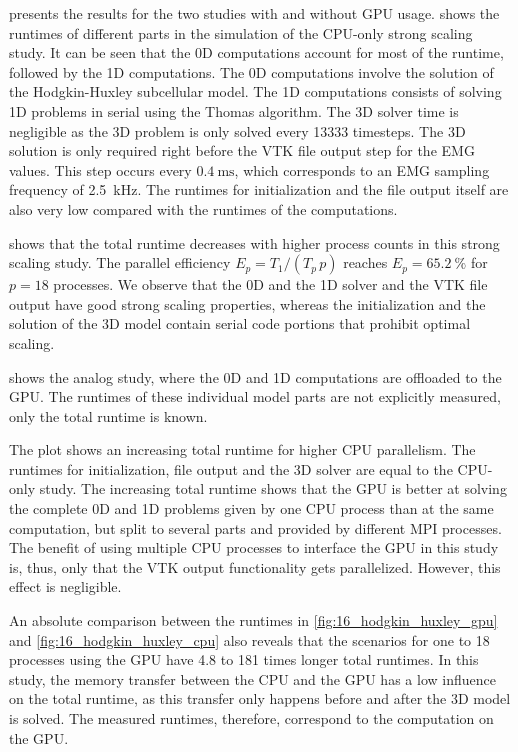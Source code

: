  presents the results for the two studies with and without GPU usage.  shows the runtimes of different parts in the simulation of the CPU-only strong scaling study. It can be seen that the 0D computations account for most of the runtime, followed by the 1D computations. The 0D computations involve the solution of the Hodgkin-Huxley subcellular model. The 1D computations consists of solving 1D problems in serial using the Thomas algorithm. The 3D solver time is negligible as the 3D problem is only solved every \num{13333} timesteps. The 3D solution is only required right before the VTK file output step for the EMG values. This step occurs every $\SI{0.4}{\ms}$, which corresponds to an EMG sampling frequency of \SI{2.5}{\kilo\hertz}.
The runtimes for initialization and the file output itself are also very low compared with the runtimes of the computations.

 shows that the total runtime decreases with higher process counts in this strong scaling study. The parallel efficiency $E_p = T_1/(T_p\,p)$ reaches $E_p=\SI{65.2}{\percent}$ for $p=18$ processes. We observe that the 0D and the 1D solver and the VTK file output have good strong scaling properties, whereas the initialization and the solution of the 3D model contain serial code portions that prohibit optimal scaling.

 shows the analog study, where the 0D and 1D computations are offloaded to the GPU. The runtimes of these individual model parts are not explicitly measured, only the total runtime is known.

The plot shows an increasing total runtime for higher CPU parallelism. 
The runtimes for initialization, file output and the 3D solver are equal to the CPU-only study.
The increasing total runtime shows that the GPU is better at solving the complete 0D and 1D problems 
given by one CPU process than at the same computation, but split to several parts and provided by different MPI processes. 
The benefit of using multiple CPU processes to interface the GPU in this study is, thus, only that the VTK output functionality gets parallelized. However, this effect is negligible.

An absolute comparison between the runtimes in \cref{fig:16_hodgkin_huxley_gpu} and \cref{fig:16_hodgkin_huxley_cpu} also reveals that the scenarios for one to 18 processes using the GPU have 4.8 to 181 times longer total runtimes. In this study, the memory transfer between the CPU and the GPU has a low influence on the total runtime, as this transfer only happens before and after the 3D model is solved. The measured runtimes, therefore, correspond to the computation on the GPU.

